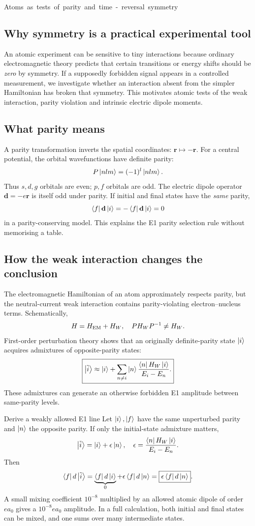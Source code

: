\unit{Atoms as tests of parity and time-reversal symmetry}
\subsection{Why symmetry is a practical experimental tool}
An atomic experiment can be sensitive to
tiny interactions because ordinary
electromagnetic theory predicts that
certain transitions or energy shifts
should be \emph{zero} by symmetry.
If a supposedly forbidden signal
appears in a controlled measurement,
we investigate whether an interaction
absent from the simpler Hamiltonian
has broken that symmetry.
This motivates atomic tests of the
weak interaction, parity violation
and intrinsic electric dipole moments.

\subsection{What parity means}
A parity transformation inverts the
spatial coordinates:
\(\mathbf r\mapsto-\mathbf r\).
For a central potential, the orbital
wavefunctions have definite parity:
\[
P\left\lvert nlm\right\rangle=(-1)^l\left\lvert nlm\right\rangle.
\]
Thus \(s,d,g\) orbitals are even;
\(p,f\) orbitals are odd.
The electric dipole operator
\(\mathbf d=-e\mathbf r\)
is itself odd under parity.
If initial and final states have
the \emph{same} parity,
\[
\left\langle f\right\rvert\mathbf d\left\lvert i\right\rangle
=-\left\langle f\right\rvert\mathbf d\left\lvert i\right\rangle=0
\]
in a parity-conserving model.
This explains the E1 parity selection
rule without memorising a table.

\subsection{How the weak interaction changes the conclusion}
The electromagnetic Hamiltonian of
an atom approximately respects parity,
but the neutral-current weak
interaction contains parity-violating
electron--nucleus terms. Schematically,
\[
H=H_{\rm EM}+H_W,
\quad P H_WP^{-1}\ne H_W.
\]
First-order perturbation theory shows
that an originally definite-parity
state \(\left\lvert i\right\rangle\) acquires admixtures
of opposite-parity states:
\[
\boxed{\left\lvert \tilde i\right\rangle\approx\left\lvert i\right\rangle+
\sum_{n\ne i}\left\lvert n\right\rangle
\frac{\left\langle n\right\rvert H_W\left\lvert i\right\rangle}{E_i-E_n}.}
\]
These admixtures can generate an
otherwise forbidden E1 amplitude
between same-parity levels.

\begin{worked}{Derive a weakly allowed E1 line}
Let \(\left\lvert i\right\rangle,\left\lvert f\right\rangle\) have the same
unperturbed parity and \(\left\lvert n\right\rangle\)
the opposite parity. If only the
initial-state admixture matters,
\[
\left\lvert \tilde i\right\rangle=\left\lvert i\right\rangle+\epsilon\left\lvert n\right\rangle,
\quad
\epsilon=\frac{\left\langle n\right\rvert H_W\left\lvert i\right\rangle}{E_i-E_n}.
\]
Then
\[
\left\langle f\right\rvert d\left\lvert \tilde i\right\rangle
=\underbrace{\left\langle f\right\rvert d\left\lvert i\right\rangle}_{0}
+\epsilon\left\langle f\right\rvert d\left\lvert n\right\rangle
=\boxed{\epsilon\left\langle f\right\rvert d\left\lvert n\right\rangle}.
\]
A small mixing coefficient \(10^{-8}\)
multiplied by an allowed atomic dipole
of order \(ea_0\) gives a
\(10^{-8}ea_0\) amplitude.
In a full calculation, both initial
and final states can be mixed, and
one sums over many intermediate states.
\end{worked}

